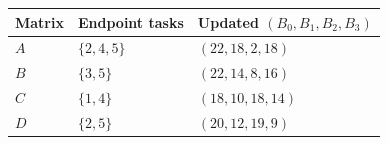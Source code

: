 \begin{tabular}{lll}
\toprule
Matrix & Endpoint tasks & Updated $(B_0,B_1,B_2,B_3)$\\
\midrule
$A$ & $\{2,4,5\}$ & $(22,18,2,18)$ \\
$B$ & $\{3,5\}$ & $(22,14,8,16)$ \\
$C$ & $\{1,4\}$ & $(18,10,18,14)$ \\
$D$ & $\{2,5\}$ & $(20,12,19,9)$ \\
\bottomrule
\end{tabular}